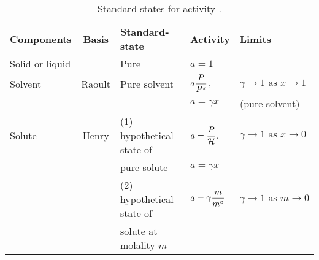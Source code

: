 \begin{table}
   \begin{center}
      \begin{tabular}{l c l l l}
          \hline
             {\bf Components}   & {\bf Basis}  & {\bf Standard-state}   & {\bf Activity}        & {\bf Limits} \\
          \hdashline
             Solid or liquid    &              &  Pure                  & $a=1$                 &              \\
          \hdashline
             Solvent            &   Raoult     &  Pure solvent          & $a\displaystyle\frac{P}{P^{\star}}$,  & $\gamma\rightarrow 1\text{ as } x\rightarrow 1$ \\
                                &              &                        & $a=\gamma x$          &  (pure solvent) \\
          \hdashline
             Solute             & Henry        & (1) hypothetical state of& $a=\displaystyle\frac{P}{\mathcal{H}}$,& $\gamma\rightarrow 1\text{ as } x\rightarrow 0$ \\
                                &              & pure solute            & $a=\gamma x$          &                                     \\
          \hdashline
                                &              & (2) hypothetical state of& $a=\gamma\displaystyle\frac{m}{m^{\circ}}$& $\gamma\rightarrow 1\text{ as } m\rightarrow 0$ \\
                                &              & solute at molality $m$   &                     &                                     \\
         \hline 
       \end{tabular}
       \caption{Standard states for activity \citep[extracted from][]{Atkins_Book}.}\label{Chapter:SolutionThermodynamics:Table:StandarStateActivity}
   \end{center}
\end{table}
      
